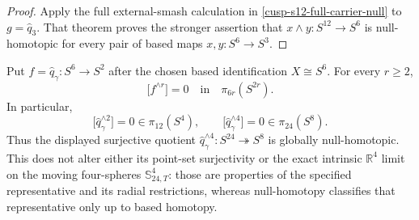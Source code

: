 \begin{proof}
Apply the full external-smash calculation in
\cref{cusp-s12-full-carrier-null} to
\(g=\widehat q_3\).  That theorem proves the stronger assertion that
\(x\wedge y:S^{12}\to S^6\) is null-homotopic for every pair of based
maps \(x,y:S^6\to S^3\).
\end{proof}

\begin{corollary}
\label{cusp-cone-S24-sphere-map-null}
Put \(f=\widehat q_\gamma:S^6\to S^2\) after the chosen based
identification \(X\cong S^6\).  For every \(r\geq2\),
\begin{equation}
 \bigl[f^{\wedge r}\bigr]=0
 \quad\text{in}\quad
 \pi_{6r}(S^{2r}).
 \label{cusp-cone-S24-null-maps}
\end{equation}
In particular,
\begin{equation}
 \bigl[\widehat q_\gamma^{\wedge2}\bigr]
 =0\in\pi_{12}(S^4),
 \qquad
 \bigl[\widehat q_\gamma^{\wedge4}\bigr]
 =0\in\pi_{24}(S^8).
 \label{cusp-cone-S24-null-special-cases}
\end{equation}
Thus the displayed surjective quotient
\(\widehat q_\gamma^{\wedge4}:S^{24}\twoheadrightarrow S^8\) is globally
null-homotopic.  This does not alter either its point-set surjectivity or the
exact intrinsic \(\mathbb R^4\) limit on the moving four-spheres
\(\mathbb S_{24,T}^4\): those are properties of the specified representative
and its radial restrictions, whereas null-homotopy classifies that
representative only up to based homotopy.
\end{corollary}

